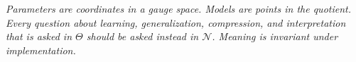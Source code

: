 \documentclass[twocolumn,10pt]{article}
\theoremstyle{thmstyle}
\theoremstyle{defstyle}
\begin{document}
\begin{center}
\itshape
Parameters are coordinates in a gauge space. Models are points in the
quotient. Every question about learning, generalization, compression,
and interpretation that is asked in $\Theta$ should be asked instead
in $\mathcal{N}$. Meaning is invariant under implementation.
\end{center}



\end{document}
